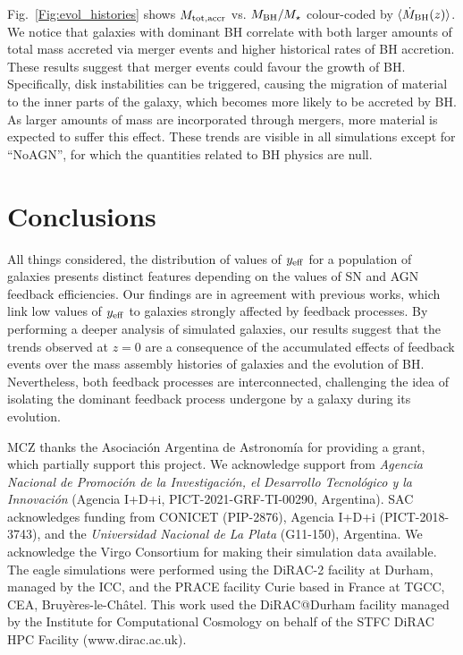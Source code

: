 \documentclass[baaa]{baaa}
\begin{document}
Fig.~\ref{Fig:evol_histories} shows $M_{\rm tot, accr}$ vs. $M_{\rm BH}/M_\star$ colour-coded by $\langle \Dot{M}_{\rm BH}(z) \rangle$. We notice that galaxies with dominant BH correlate with both larger amounts of total mass accreted via merger events and higher historical rates of BH accretion. These results suggest that merger events could favour the growth of BH. Specifically, disk instabilities can be triggered, causing the migration of material to the inner parts of the galaxy, which becomes more likely to be accreted by BH. As larger amounts of mass are incorporated through mergers, more material is expected to suffer this effect. These trends are visible in all simulations except for ``NoAGN'', for which the quantities related to BH physics are null.
\section{Conclusions}
All things considered, the distribution of values of $y_{\rm eff}$ for a population of galaxies presents distinct features depending on the values of SN and AGN feedback efficiencies. Our findings are in agreement with previous works, which link low values of $y_{\rm eff}$ to galaxies strongly affected by feedback processes. By performing a deeper analysis of simulated galaxies, our results suggest that the trends observed at $z=0$ are a consequence of the accumulated effects of feedback events over the mass assembly histories of galaxies and the evolution of BH. Nevertheless, both feedback processes are interconnected, challenging the idea of isolating the dominant feedback process undergone by a galaxy during its evolution. 
\begin{acknowledgement}
MCZ thanks the Asociación Argentina de Astronomía for providing a grant, which partially support this project. 
We acknowledge support from {\it Agencia Nacional de Promoci\'on de la Investigaci\'on, el Desarrollo Tecnol\'ogico y la Innovaci\'on} (Agencia I+D+i, PICT-2021-GRF-TI-00290, Argentina). 
SAC acknowledges funding from CONICET (PIP-2876), Agencia I+D+i (PICT-2018-3743), and the {\it Universidad Nacional de La Plata} (G11-150), Argentina. We acknowledge the Virgo Consortium for making their simulation data available. The {\sc eagle} simulations were performed using the DiRAC-2 facility at Durham, managed by the ICC, and the PRACE facility Curie based in France at TGCC, CEA, Bruyères-le-Châtel. This work used the DiRAC@Durham facility managed by the Institute for Computational Cosmology on behalf of the STFC DiRAC HPC Facility (www.dirac.ac.uk).
\end{acknowledgement}
\end{document}
